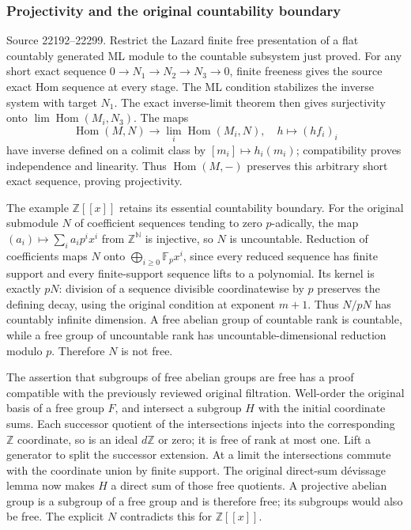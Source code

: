 \subsubsection{Projectivity and the original countability boundary}\label{algebra-proof-013-projectivity-and-the-original-countability-boundary}

Source 22192--22299. Restrict the Lazard finite free presentation of a flat countably generated ML module to the countable subsystem just proved. For any short exact sequence \(0\to N_1\to N_2\to N_3\to0\), finite freeness gives the source exact Hom sequence at every stage. The ML condition stabilizes the inverse system with target \(N_1\). The exact inverse-limit theorem then gives surjectivity onto \(\lim\operatorname{Hom}(M_i,N_3)\). The maps \[
\operatorname{Hom}(M,N)\longrightarrow\lim_i\operatorname{Hom}(M_i,N),
\quad h\longmapsto(hf_i)_i
\] have inverse defined on a colimit class by \([m_i]\mapsto h_i(m_i)\); compatibility proves independence and linearity. Thus \(\operatorname{Hom}(M,-)\) preserves this arbitrary short exact sequence, proving projectivity.

The example \(\mathbb Z[[x]]\) retains its essential countability boundary. For the original submodule \(N\) of coefficient sequences tending to zero \(p\)-adically, the map \((a_i)\mapsto\sum_i a_i p^i x^i\) from \(\mathbb Z^{\mathbb N}\) is injective, so \(N\) is uncountable. Reduction of coefficients maps \(N\) onto \(\bigoplus_{i\geq0}\mathbb F_p x^i\), since every reduced sequence has finite support and every finite-support sequence lifts to a polynomial. Its kernel is exactly \(pN\): division of a sequence divisible coordinatewise by \(p\) preserves the defining decay, using the original condition at exponent \(m+1\). Thus \(N/pN\) has countably infinite dimension. A free abelian group of countable rank is countable, while a free group of uncountable rank has uncountable-dimensional reduction modulo \(p\). Therefore \(N\) is not free.

The assertion that subgroups of free abelian groups are free has a proof compatible with the previously reviewed original filtration. Well-order the original basis of a free group \(F\), and intersect a subgroup \(H\) with the initial coordinate sums. Each successor quotient of the intersections injects into the corresponding \(\mathbb Z\) coordinate, so is an ideal \(d\mathbb Z\) or zero; it is free of rank at most one. Lift a generator to split the successor extension. At a limit the intersections commute with the coordinate union by finite support. The original direct-sum dévissage lemma now makes \(H\) a direct sum of those free quotients. A projective abelian group is a subgroup of a free group and is therefore free; its subgroups would also be free. The explicit \(N\) contradicts this for \(\mathbb Z[[x]]\).

